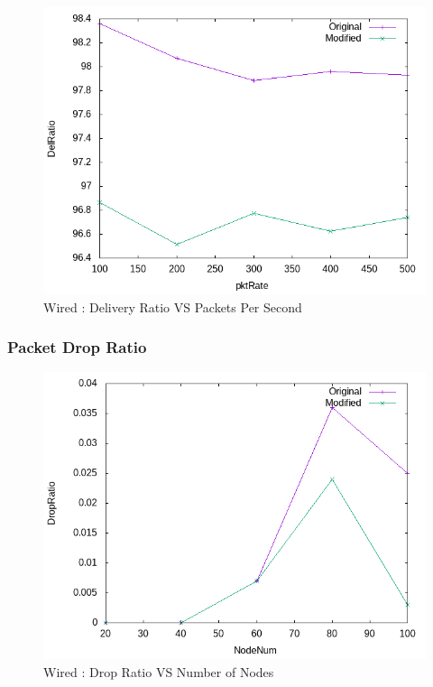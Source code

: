     \begin{figure}[!h]
        \centering
        \includegraphics[width=.9\textwidth]{Pictures/Wired/Combined/DelRatioVSpktRate.png}
        \caption{Wired : Delivery Ratio VS Packets Per Second}
    \end{figure}

\newpage
\subsubsection{Packet Drop Ratio}
    \begin{figure}[!h]
        \centering
        \includegraphics[width=.9\textwidth]{Pictures/Wired/Combined/DropRatioVSNodeNum.png}
        \caption{Wired : Drop Ratio VS Number of Nodes}
    \end{figure}
    

